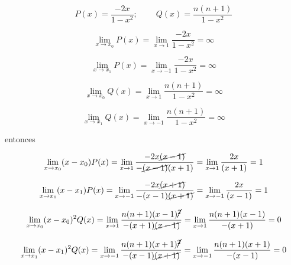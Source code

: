 \documentclass[12pt,a4paper]{article}
\begin{document}
\begin{enumerate}
    \begin{equation*}
        P(x) = \frac{-2x}{1-x^2} \text{;} \hspace{1cm} Q(x) = \frac{n(n+1)}{1-x^2}
    \end{equation*}
    
    \begin{equation*}
        \lim_{x \rightarrow x_0} P(x) = \lim_{x \rightarrow 1} \frac{-2x}{1-x^2} = \infty 
    \end{equation*}
    
    \begin{equation*}
        \lim_{x \rightarrow x_1} P(x) = \lim_{x \rightarrow -1} \frac{-2x}{1-x^2} = \infty 
    \end{equation*}
    
    \begin{equation*}
        \lim_{x \rightarrow x_0} Q(x) = \lim_{x \rightarrow 1} \frac{n(n+1)}{1-x^2} = \infty 
    \end{equation*}
    
    \begin{equation*}
        \lim_{x \rightarrow x_1} Q(x) = \lim_{x \rightarrow -1} \frac{n(n+1)}{1-x^2} = \infty 
    \end{equation*}
    
    entonces
    
    
    \begin{equation*}
        \lim_{x \rightarrow x_0}(x-x_0) P(x) = \lim_{x \rightarrow 1} \frac{-2x\cancel{(x-1)}}{-\cancel{(x-1)}(x+1)} = \lim_{x \rightarrow 1} \frac{2x}{(x+1)}= 1
    \end{equation*}
    
    \begin{equation*}
        \lim_{x \rightarrow x_1}(x-x_1) P(x) = \lim_{x \rightarrow -1} \frac{-2x\cancel{(x+1)}}{-(x-1)\cancel{(x+1)}} =  \lim_{x \rightarrow -1} \frac{2x}{(x-1)} = 1
    \end{equation*}
    
    \begin{equation*}
        \lim_{x \rightarrow x_0}(x-x_0)^2 Q(x) = \lim_{x \rightarrow 1} \frac{n(n+1)(x-1)\cancel{^2}}{-(x+1)\cancel{(x-1)}} = \lim_{x \rightarrow 1}\frac{n(n+1)(x-1)}{-(x+1)} = 0 
    \end{equation*}
    
    \begin{equation*}
        \lim_{x \rightarrow x_1}(x-x_1)^2 Q(x) = \lim_{x \rightarrow -1} \frac{n(n+1)(x+1)\cancel{^2}}{-(x-1)\cancel{(x+1)}} = \lim_{x \rightarrow -1}\frac{n(n+1)(x+1)}{-(x-1)}= 0
    \end{equation*}
    

\end{enumerate}
\end{document}
